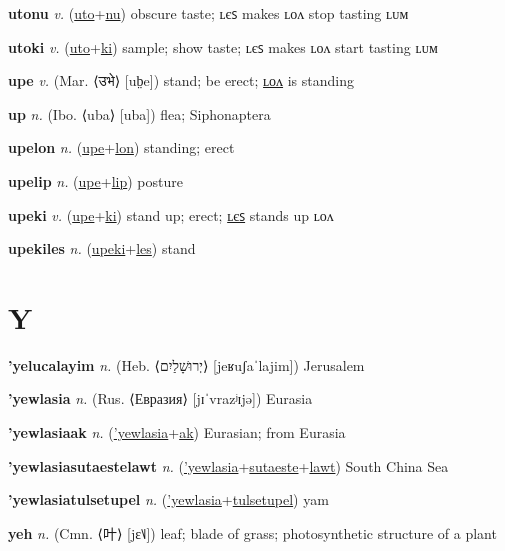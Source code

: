 \textbf{\hypertarget{utonu}{utonu}} \textit{v.} (\hyperlink{uto}{uto}+\allowbreak \hyperlink{nu}{nu})
obscure taste; ʟєꜱ makes ʟᴏᴧ stop tasting ʟᴜᴍ

\textbf{\hypertarget{utoki}{utoki}} \textit{v.} (\hyperlink{uto}{uto}+\allowbreak \hyperlink{ki}{ki})
sample; show taste; ʟєꜱ makes ʟᴏᴧ start tasting ʟᴜᴍ

\textbf{\hypertarget{upe}{upe}} \textit{v.} (Mar. ⟨{\devanagari{}उभे}⟩ [ub̤e])
stand; be erect; \hyperlink{upelon}{ʟᴏᴧ} is standing

\textbf{\hypertarget{up}{up}} \textit{n.} (Ibo. ⟨uba⟩ [uba])
flea; Siphonaptera

\textbf{\hypertarget{upelon}{upelon}} \textit{n.} (\hyperlink{upe}{upe}+\allowbreak \hyperlink{lon}{lon})
standing; erect

\textbf{\hypertarget{upelip}{upelip}} \textit{n.} (\hyperlink{upe}{upe}+\allowbreak \hyperlink{lip}{lip})
posture

\textbf{\hypertarget{upeki}{upeki}} \textit{v.} (\hyperlink{upe}{upe}+\allowbreak \hyperlink{ki}{ki})
stand up; erect; \hyperlink{upekiles}{ʟєꜱ} stands up ʟᴏᴧ

\textbf{\hypertarget{upekiles}{upekiles}} \textit{n.} (\hyperlink{upeki}{upeki}+\allowbreak \hyperlink{les}{les})
stand

\section{Y}

\textbf{\hypertarget{'yelucalayim}{'yelucalayim}} \textit{n.} (Heb. ⟨{\hebrew{}יְרוּשָׁלַיִם}⟩ [jeʁuʃaˈlajim])
Jerusalem

\textbf{\hypertarget{'yewlasia}{'yewlasia}} \textit{n.} (Rus. ⟨Евразия⟩ [jɪˈvrazʲɪjə])
Eurasia

\textbf{\hypertarget{'yewlasiaak}{'yewlasiaak}} \textit{n.} (\hyperlink{'yewlasia}{'yewlasia}+\allowbreak \hyperlink{ak}{ak})
Eurasian; from Eurasia

\textbf{\hypertarget{'yewlasiasutaestelawt}{'yewlasiasutaestelawt}} \textit{n.} (\hyperlink{'yewlasia}{'yewlasia}+\allowbreak \hyperlink{sutaeste}{sutaeste}+\allowbreak \hyperlink{lawt}{lawt})
South China Sea

\textbf{\hypertarget{'yewlasiatulsetupel}{'yewlasiatulsetupel}} \textit{n.} (\hyperlink{'yewlasia}{'yewlasia}+\allowbreak \hyperlink{tulsetupel}{tulsetupel})
yam

\textbf{\hypertarget{yeh}{yeh}} \textit{n.} (Cmn. ⟨{\chinese{}叶}⟩ [jɛ˥˩])
leaf; blade of grass; photosynthetic structure of a plant

